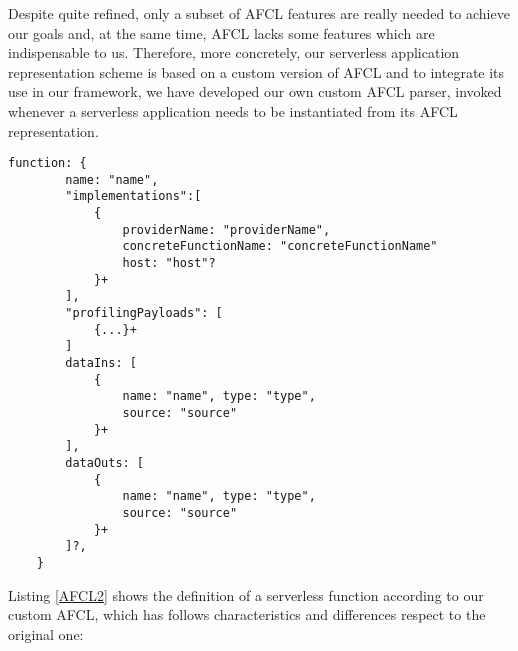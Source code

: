 \documentclass[12pt,a4paper]{report}
\begin{document}
Despite quite refined, only a subset of AFCL features are really needed to achieve our goals and, at the same time, AFCL lacks some features which are indispensable to us. Therefore, more concretely, our serverless application representation scheme is based on a custom version of AFCL and to integrate its use in our framework, we have developed our own custom AFCL parser, invoked whenever a serverless application needs to be instantiated from its AFCL representation. 

\begin{lstlisting}[frame=lines, caption={Definition of a serverless function according to our custom AFCL.}, label={AFCL2}]
	function: {
		name: "name",
		"implementations":[
			{
				providerName: "providerName", 
				concreteFunctionName: "concreteFunctionName"
				host: "host"?
			}+
		],
		"profilingPayloads": [
			{...}+
		]
		dataIns: [
			{
				name: "name", type: "type",
				source: "source"
			}+
		],
		dataOuts: [
			{
				name: "name", type: "type",
				source: "source"
			}+
		]?,
	}
\end{lstlisting}

Listing \ref{AFCL2} shows the definition of a serverless function according to our custom AFCL, which has follows characteristics and differences respect to the original one:
\end{document}
